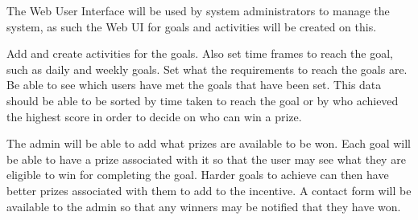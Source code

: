 The Web User Interface will be used by system administrators to manage the system, as such the Web UI for goals and activities will be created on this.

\FunqReq
{Add and create activities for the goals. Also set time frames to reach the goal, such as daily and weekly goals.}
{Set what the requirements to reach the goals are.}
{Be able to see which users have met the goals that have been set. This data should be able  to be sorted by time taken to reach the goal or by who achieved the highest score in order to decide on who can win a prize.}

\FuncReq
{The admin will be able to add what prizes are available to be won.}
{Each goal will be able to have a prize associated with it so that the user may see what they are eligible to win for completing the goal. Harder goals to achieve can then have better prizes associated with them to add to the incentive.}
{A contact form will be available to the admin so that any winners may be notified that they have won.}

